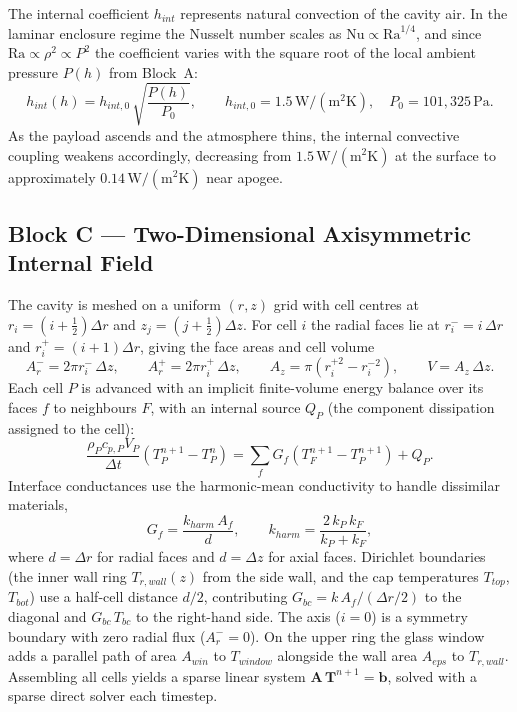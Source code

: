 \documentclass[11pt,a4paper]{article}
\newcommand{\unit}[1]{\,\mathrm{#1}}
\begin{document}
The internal coefficient $h_{int}$ represents natural convection of the cavity air.
In the laminar enclosure regime the Nusselt number scales as
$\mathrm{Nu}\propto\mathrm{Ra}^{1/4}$, and since $\mathrm{Ra}\propto\rho^{2}\propto P^{2}$
the coefficient varies with the square root of the local ambient pressure $P(h)$ from
Block~A:
\begin{equation}
h_{int}(h) = h_{int,0}\,\sqrt{\frac{P(h)}{P_0}},
\qquad h_{int,0}=1.5\unit{W/(m^2 K)},\quad P_0 = 101{,}325\unit{Pa}.
\end{equation}
As the payload ascends and the atmosphere thins, the internal convective coupling
weakens accordingly, decreasing from $1.5\unit{W/(m^2 K)}$ at the surface to
approximately $0.14\unit{W/(m^2 K)}$ near apogee.

\subsection{Block C --- Two-Dimensional Axisymmetric Internal Field}
The cavity is meshed on a uniform $(r,z)$ grid with cell centres at
$r_i=(i+\tfrac12)\Delta r$ and $z_j=(j+\tfrac12)\Delta z$. For cell $i$ the radial faces
lie at $r_i^- = i\,\Delta r$ and $r_i^+ = (i+1)\Delta r$, giving the face areas and cell
volume
\begin{equation}
A_{r}^{-} = 2\pi r_i^{-}\,\Delta z,\qquad
A_{r}^{+} = 2\pi r_i^{+}\,\Delta z,\qquad
A_{z} = \pi\!\left(r_i^{+2}-r_i^{-2}\right),\qquad
V = A_z\,\Delta z .
\end{equation}
Each cell $P$ is advanced with an implicit finite-volume energy balance over its faces
$f$ to neighbours $F$, with an internal source $Q_P$ (the component dissipation assigned
to the cell):
\begin{equation}
\frac{\rho_P c_{p,P} V_P}{\Delta t}\left(T_P^{n+1}-T_P^{n}\right)
= \sum_{f} G_f\left(T_F^{n+1}-T_P^{n+1}\right) + Q_P .
\end{equation}
Interface conductances use the harmonic-mean conductivity to handle dissimilar
materials,
\begin{equation}
G_f = \frac{k_{harm}\,A_f}{d},\qquad
k_{harm} = \frac{2\,k_P\,k_F}{k_P+k_F},
\end{equation}
where $d=\Delta r$ for radial faces and $d=\Delta z$ for axial faces. Dirichlet
boundaries (the inner wall ring $T_{r,wall}(z)$ from the side wall, and the cap
temperatures $T_{top}$, $T_{bot}$) use a half-cell distance $d/2$, contributing
$G_{bc}=k\,A_f/(\Delta r/2)$ to the diagonal and $G_{bc}\,T_{bc}$ to the right-hand side.
The axis ($i=0$) is a symmetry boundary with zero radial flux ($A_r^{-}=0$). On the
upper ring the glass window adds a parallel path of area $A_{win}$ to $T_{window}$
alongside the wall area $A_{eps}$ to $T_{r,wall}$. Assembling all cells yields a sparse
linear system $\mathbf{A}\,\mathbf{T}^{n+1}=\mathbf{b}$, solved with a sparse direct
solver each timestep.
\end{document}
